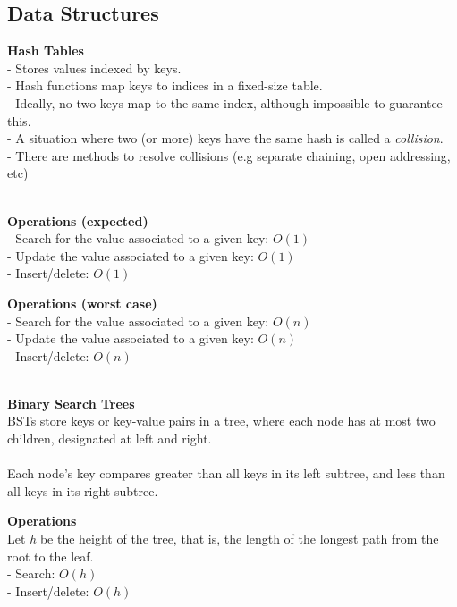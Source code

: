 \documentclass{article}
\begin{document}
\subsection{Data Structures}
\textbf{Hash Tables} \\
- Stores values indexed by keys. \\
- Hash functions map keys to indices in a fixed-size table. \\
- Ideally, no two keys map to the same index, although impossible to guarantee this. \\
- A situation where two (or more) keys have the same hash is called a \emph{collision}. \\
- There are methods to resolve collisions (e.g separate chaining, open addressing, etc)
\\\\
\begin{tcolorbox}
    \textbf{Operations (expected)} \\
    - Search for the value associated to a given key: $O(1)$ \\
    - Update the value associated to a given key: $O(1)$ \\
    - Insert/delete: $O(1)$
\end{tcolorbox}
\begin{tcolorbox}
\textbf{Operations (worst case)} \\
    - Search for the value associated to a given key: $O(n)$ \\
    - Update the value associated to a given key: $O(n)$ \\
    - Insert/delete: $O(n)$
\end{tcolorbox}
~\\
\textbf{Binary Search Trees} \\
BSTs store keys or key-value pairs in a tree, where each node has at most two children, designated at left and right.
\\\\
Each node's key compares greater than all keys in its left subtree, and less than all keys in its right subtree.
\begin{tcolorbox}
    \textbf{Operations} \\
    Let \emph{h} be the height of the tree, that is, the length of the longest path from the root to the leaf. \\
    - Search: $O(h)$ \\
    - Insert/delete: $O(h)$
\end{tcolorbox}
~\\
\end{document}
